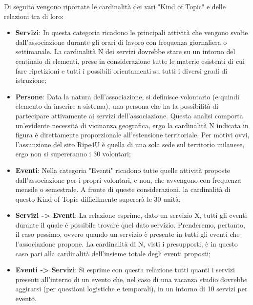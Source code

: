     Di seguito vengono riportate le cardinalità dei vari "Kind of Topic" e delle
    relazioni tra di loro:
    \begin{itemize}
        \item \textbf{Servizi}: In questa categoria ricadono le principali
        attività che vengono svolte dall'associazione durante gli orari di
        lavoro con frequenza giornaliera o settimanale. La cardinalità N dei
        servizi dovrebbe stare su un intorno del centinaio di elementi, prese in
        considerazione tutte le materie esistenti di cui fare ripetizioni e
        tutti i possibili orientamenti su tutti i diversi gradi di istruzione;
        \item \textbf{Persone}: Data la natura dell'associazione, si definisce
        volontario (e quindi elemento da inserire a sistema), una persona che ha
        la possibilità di partecipare attivamente ai servizi dell'associazione.
        Questa analisi comporta un'evidente necessità di vicinanza geografica,
        ergo la cardinalità N indicata in figura è direttamente proporzionale
        all'estensione territoriale. Per motivi ovvi, l'assunzione del sito
        Ripe4U è quella di una sola sede sul territorio milanese, ergo non si
        supereranno i 30 volontari;
        \item \textbf{Eventi}: Nella categoria "Eventi" ricadono tutte quelle
        attività proposte dall'associazione per i propri volontari, e non, che
        avvengono con frequenza mensile o semestrale. A fronte di queste
        considerazioni, la cardinalità di questo Kind of Topic difficilmente
        supererà le 30 unità;
        \item \textbf{Servizi -> Eventi}: La relazione esprime, dato un servizio
        X, tutti gli eventi durante il quale è possibile trovare quel dato
        servizio. Prenderemo, pertanto, il caso pessimo, ovvero quando un
        servizio è presente in tutti gli eventi che l'associazione propone. La
        cardinalità di N, visti i presupposti, è in questo caso pari alla
        cardinalità dell'insieme totale degli eventi proposti;
        \item \textbf{Eventi -> Servizi}: Si esprime con questa relazione tutti
        quanti i servizi presenti all'interno di un evento che, nel caso di una
        vacanza studio dovrebbe aggirarsi (per questioni logistiche e
        temporali), in un intorno di 10 servizi per evento.
    \end{itemize} 
